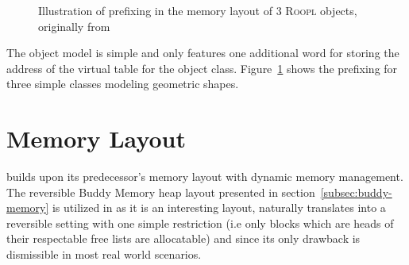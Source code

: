 \begin{figure}[ht]
\begin{subfigure}[t]{.32\textwidth}
    \end{subfigure}
    \begin{subfigure}[t]{.32\textwidth}
        \vskip 0pt
        \centering
    \end{subfigure}
    
    \caption[Illustration of object memory layout]{Illustration of prefixing in the memory layout of 3 \textsc{Roopl} objects, originally from~\cite{th:roopl}}
    \label{fig:roopl-object-layout}
\end{figure}

The object model is simple and only features one additional word for storing the address of the virtual table for the object class. Figure~\ref{fig:roopl-object-layout} shows the prefixing for three simple classes modeling geometric shapes.


\section{\rooplpp Memory Layout}
\label{sec:rooplpp-memory-layout}
\rooplpp builds upon its predecessor's memory layout with dynamic memory management. The reversible Buddy Memory heap layout presented in section~\ref{subsec:buddy-memory} is utilized in \rooplpp as it is an interesting layout, naturally translates into a reversible setting with one simple restriction (i.e only blocks which are heads of their respectable free lists are allocatable) and since its only drawback is dismissible in most real world scenarios.

